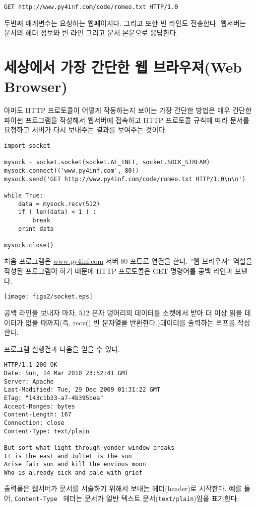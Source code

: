 {\tt GET http://www.py4inf.com/code/romeo.txt HTTP/1.0 }

두번째 매개변수는 요청하는 웹페이지다. 그리고 또한 빈 라인도 전송한다. 웹서버는 문서의 헤더 정보와 빈 라인 그리고 문서 본문으로 응답한다.


\section{세상에서 가장 간단한 웹 브라우져(Web Browser)}
아마도 HTTP 프로토콜이 어떻게 작동하는지 보이는 가장 간단한 방법은 매우 간단한 파이썬 프로그램을 작성해서 웹서버에 접속하고 
HTTP 프로토콜 규칙에 따라 문서를 요청하고 서버가 다시 보내주는 결과를 보여주는 것이다.

\beforeverb
\begin{verbatim}
import socket

mysock = socket.socket(socket.AF_INET, socket.SOCK_STREAM)
mysock.connect(('www.py4inf.com', 80))
mysock.send('GET http://www.py4inf.com/code/romeo.txt HTTP/1.0\n\n')

while True:
    data = mysock.recv(512)
    if ( len(data) < 1 ) :
        break
    print data

mysock.close()
\end{verbatim}
\afterverb
%

처음 프로그램은 \url{www.py4inf.com} 서버 80 포트로 연결을 한다.
''웹 브라우져'' 역할을 작성된 프로그램이 하기 때문에 HTTP 프로토콜은 GET 명령어를 공백 라인과 보낸다.

\beforefig
\centerline{\texttt{[image: figs2/socket.eps]}}
\afterfig

공백 라인을 보내자 마자, 512 문자 덩어리의 데이터를 소켓에서 받아 더 이상 읽을 데이터가 없을 때까지(즉, recv() 빈 문자열을 반환한다.)데이터를 출력하는 루프를 작성한다.

프로그램 실행결과 다음을 얻을 수 있다.

\beforeverb
\begin{verbatim}
HTTP/1.1 200 OK
Date: Sun, 14 Mar 2010 23:52:41 GMT
Server: Apache
Last-Modified: Tue, 29 Dec 2009 01:31:22 GMT
ETag: "143c1b33-a7-4b395bea"
Accept-Ranges: bytes
Content-Length: 167
Connection: close
Content-Type: text/plain

But soft what light through yonder window breaks
It is the east and Juliet is the sun
Arise fair sun and kill the envious moon
Who is already sick and pale with grief
\end{verbatim}
\afterverb
%

출력물은 웹서버가 문서를 서술하기 위해서 보내는 헤더(header)로 시작한다.
예를 들어, {\tt Content-Type } 헤더는 문서가 일반 텍스트 문서({\tt text/plain})임을 표기한다.

